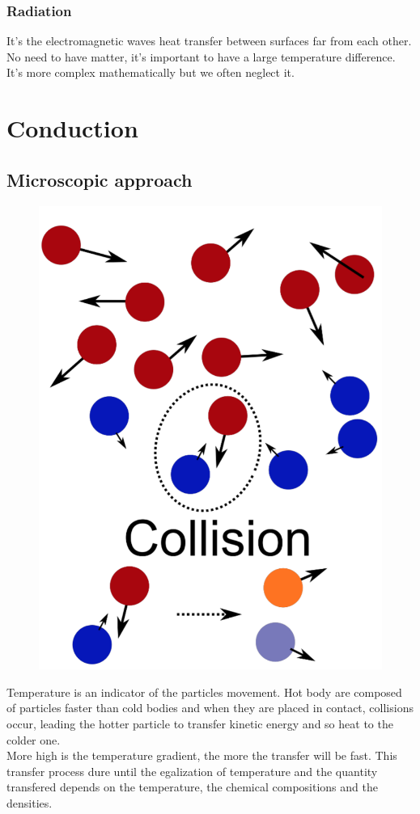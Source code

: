 		\subsubsection{Radiation}
		It's the electromagnetic waves heat transfer between surfaces far from each other. No need to have matter, it’s important to have a large temperature difference. It’s more complex mathematically but we often neglect it.
		
	\section{Conduction}
		\subsection{Microscopic approach}
			\begin{figure}
 			\vspace{-5mm}
 			\includegraphics[scale=0.2]{ch3/3}
 			\end{figure}
 			Temperature is an indicator of the particles movement. Hot body are composed of particles faster than cold bodies and when they are placed in contact, collisions occur, leading the hotter particle to transfer kinetic energy and so heat to the colder one. \\
 			More high is the temperature gradient, the more the transfer will be fast. This transfer process dure until the egalization of temperature and the quantity transfered depends on the temperature, the chemical compositions and the densities. 
 			
